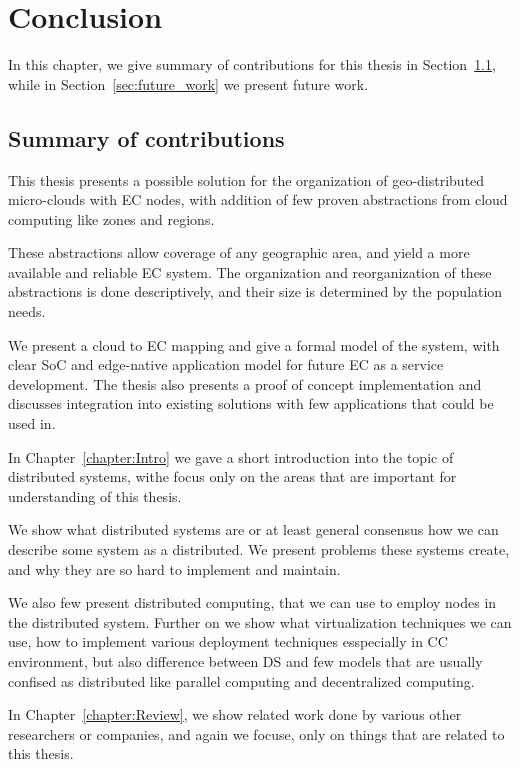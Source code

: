 \chapter{Conclusion}\label{chapter:Conclusion}
%
In this chapter, we give summary of contributions for this thesis in Section~\ref{sec:summary_of_contributions}, while in Section~\ref{sec:future_work} we present future work.
%
%
\section{Summary of contributions}\label{sec:summary_of_contributions}
%
This thesis presents a possible solution for the organization of geo-distributed micro-clouds with EC nodes, with addition of few proven abstractions from cloud computing like zones and regions. 

These abstractions allow coverage of any geographic area, and yield a more available and reliable EC system. The organization and reorganization of these abstractions is done descriptively, and their size is determined by the population needs. 

We present a cloud to EC mapping and give a formal model of the system, with clear SoC and edge-native application model for future EC as a service development. The thesis also presents a proof of concept implementation and discusses integration into existing solutions with few applications that could be used in.

In Chapter~\ref{chapter:Intro} we gave a short introduction into the topic of distributed systems,  withe focus only on the areas that are important for understanding of this thesis. 

We show what distributed systems are or at least general consensus how we can describe some system as a distributed. We present problems these systems create, and why they are so hard to implement and maintain. 

We also few present distributed computing, that we can use to employ nodes in the distributed system. Further on we show what virtualization techniques we can use, how to implement various deployment techniques esspecially in CC environment, but also difference between DS and few models that are usually confised as distributed like parallel computing and decentralized computing.

In Chapter~\ref{chapter:Review}, we show related work done by various other researchers or companies, and again we focuse, only on things that are related to this thesis.


